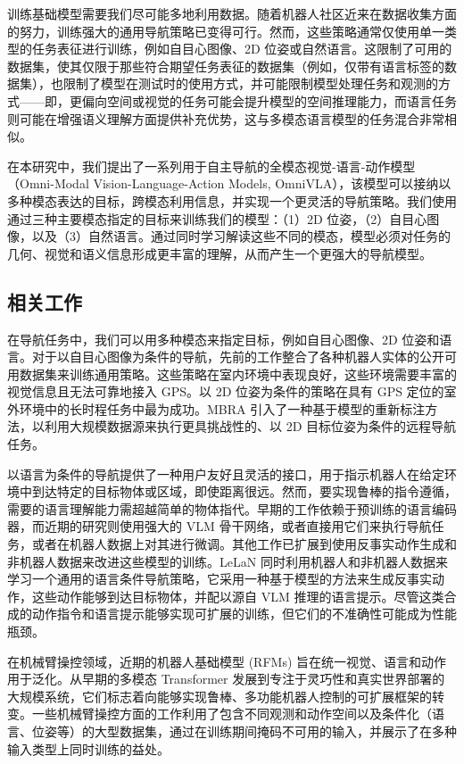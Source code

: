 训练基础模型需要我们尽可能多地利用数据。随着机器人社区近来在数据收集方面的努力，训练强大的通用导航策略已变得可行。然而，这些策略通常仅使用单一类型的任务表征进行训练，例如自目心图像、2D 位姿或自然语言。这限制了可用的数据集，使其仅限于那些符合期望任务表征的数据集（例如，仅带有语言标签的数据集），也限制了模型在测试时的使用方式，并可能限制模型处理任务和观测的方式——即，更偏向空间或视觉的任务可能会提升模型的空间推理能力，而语言任务则可能在增强语义理解方面提供补充优势，这与多模态语言模型的任务混合非常相似。

在本研究中，我们提出了一系列用于自主导航的全模态视觉-语言-动作模型（Omni-Modal Vision-Language-Action Models, OmniVLA），该模型可以接纳以多种模态表达的目标，跨模态利用信息，并实现一个更灵活的导航策略。我们使用通过三种主要模态指定的目标来训练我们的模型：（1）2D 位姿，（2）自目心图像，以及（3）自然语言。通过同时学习解读这些不同的模态，模型必须对任务的几何、视觉和语义信息形成更丰富的理解，从而产生一个更强大的导航模型。

\subsection{相关工作}

在导航任务中，我们可以用多种模态来指定目标，例如自目心图像、2D 位姿和语言。对于以自目心图像为条件的导航，先前的工作整合了各种机器人实体的公开可用数据集来训练通用策略。这些策略在室内环境中表现良好，这些环境需要丰富的视觉信息且无法可靠地接入 GPS。以 2D 位姿为条件的策略在具有 GPS 定位的室外环境中的长时程任务中最为成功。MBRA 引入了一种基于模型的重新标注方法，以利用大规模数据源来执行更具挑战性的、以 2D 目标位姿为条件的远程导航任务。

以语言为条件的导航提供了一种用户友好且灵活的接口，用于指示机器人在给定环境中到达特定的目标物体或区域，即使距离很远。然而，要实现鲁棒的指令遵循，需要的语言理解能力需超越简单的物体指代。早期的工作依赖于预训练的语言编码器，而近期的研究则使用强大的 VLM 骨干网络，或者直接用它们来执行导航任务，或者在机器人数据上对其进行微调。其他工作已扩展到使用反事实动作生成和非机器人数据来改进这些模型的训练。LeLaN 同时利用机器人和非机器人数据来学习一个通用的语言条件导航策略，它采用一种基于模型的方法来生成反事实动作，这些动作能够到达目标物体，并配以源自 VLM 推理的语言提示。尽管这类合成的动作指令和语言提示能够实现可扩展的训练，但它们的不准确性可能成为性能瓶颈。

在机械臂操控领域，近期的机器人基础模型 (RFMs) 旨在统一视觉、语言和动作用于泛化。从早期的多模态 Transformer 发展到专注于灵巧性和真实世界部署的大规模系统，它们标志着向能够实现鲁棒、多功能机器人控制的可扩展框架的转变。一些机械臂操控方面的工作利用了包含不同观测和动作空间以及条件化（语言、位姿等）的大型数据集，通过在训练期间掩码不可用的输入，并展示了在多种输入类型上同时训练的益处。

